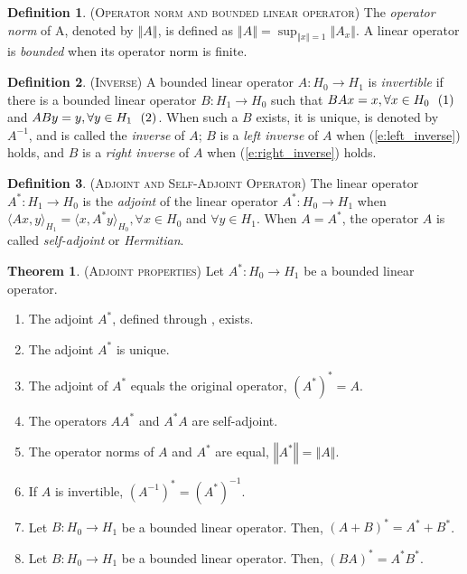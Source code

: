 \documentclass[9pt, twocolumn]{extarticle}
\theoremstyle{definition}
\newtheorem{definition}{Definition}
\newtheorem{theorem}{Theorem}
\newcommand{\inlineeqnum}{\refstepcounter{equation}~~\mbox{(\theequation)}}
\newcommand{\norm}[1]{\left\Vert #1\right\Vert}
\begin{document}
\begin{definition}{(\textsc{Operator norm and bounded linear operator})}
  The \emph{operator norm} of A, denoted by $ \norm{A} $, is defined as $ \norm{A} = \sup_{\norm{x}=1} \norm{A_x} $. A linear operator is \emph{bounded} when its operator norm is finite.
\end{definition}

\begin{definition}{(\textsc{Inverse})}
  A bounded linear operator $ A:H_0\rightarrow H_1 $ is \emph{invertible} if there is a bounded linear operator $ B: H_1\rightarrow H_0 $ such that $ BAx=x, \forall x\in H_0 \inlineeqnum\label{e:left_inverse}$ and $ ABy = y, \forall y\in H_1 \inlineeqnum\label{e:right_inverse}$. When such a $ B $ exists, it is unique, is denoted by $ A^{-1} $, and is called the \emph{inverse} of $ A $; $ B $ is a \emph{left inverse} of $ A $ when  (\ref{e:left_inverse}) holds, and $ B $ is a \emph{right inverse} of $ A $ when (\ref{e:right_inverse}) holds.
\end{definition}

\begin{definition}{(\textsc{Adjoint and Self-Adjoint Operator})}
  The linear operator $ A^*: H_1\rightarrow H_0 $ is the \emph{adjoint} of the linear operator $ A^*: H_0\rightarrow H_1 $ when $ \langle Ax, y\rangle_{H_1} = \langle x, A^*y\rangle_{H_0}, \forall x\in H_0$ and $ \forall y\in H_1 $. When $ A=A^* $, the operator $ A $ is called \emph{self-adjoint} or \emph{Hermitian}.
\end{definition}

\begin{theorem}{(\textsc{Adjoint properties})}
  Let $ A^*: H_0\rightarrow H_1 $ be a bounded linear operator.
  \begin{enumerate}[label=(\roman*)]
    \item The adjoint $ A^* $, defined through , exists.
    \item The adjoint $ A^* $ is unique.
    \item The adjoint of $ A^* $ equals the original operator, $ (A^*)^* = A $.
    \item The operators $ AA^* $ and $ A^*A $ are self-adjoint.
    \item The operator norms of $ A $ and $ A^* $ are equal, $ \norm{A^*} = \norm{A} $.
    \item If $ A $ is invertible, $ (A^{-1})^* = (A^*)^{-1} $.
    \item Let $ B:H_0\rightarrow H_1 $ be a bounded linear operator. Then, $ (A+B)^* = A^*+B^* $.
    \item Let $ B:H_0\rightarrow H_1 $ be a bounded linear operator. Then, $ (BA)^* = A^*B^* $.
  \end{enumerate}
\end{theorem}
\end{document}

